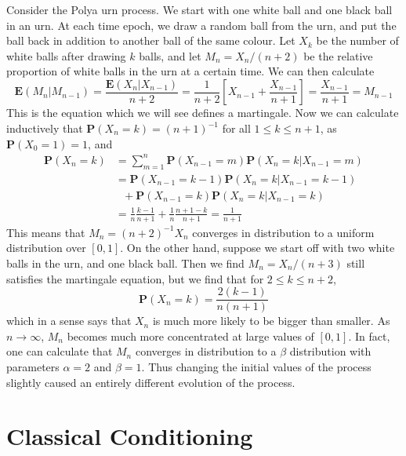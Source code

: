 \begin{example}
    Consider the Polya urn process. We start with one white ball and one black ball in an urn. At each time epoch, we draw a random ball from the urn, and put the ball back in addition to another ball of the same colour. Let $X_k$ be the number of white balls after drawing $k$ balls, and let $M_n = X_n / (n+2)$ be the relative proportion of white balls in the urn at a certain time. We can then calculate
    \[ \mathbf{E}(M_n | M_{n-1}) = \frac{\mathbf{E}(X_n | X_{n-1})}{n+2} = \frac{1}{n+2} \left[ X_{n-1} + \frac{X_{n-1}}{n+1} \right] = \frac{X_{n-1}}{n+1} = M_{n-1} \]
    This is the equation which we will see defines a martingale. Now we can calculate inductively that $\mathbf{P}(X_n = k) = (n + 1)^{-1}$ for all $1 \leq k \leq n + 1$, as $\mathbf{P}(X_0 = 1) = 1$, and
    \begin{align*}
        \mathbf{P}(X_n = k) &= \sum_{m = 1}^n \mathbf{P}(X_{n-1} = m) \mathbf{P}(X_n = k | X_{n-1} = m) \\
        &= \mathbf{P}(X_{n-1} = k-1) \mathbf{P}(X_n = k | X_{n-1} = k-1)\\
        &\ \ \ + \mathbf{P}(X_{n-1} = k) \mathbf{P}(X_n = k | X_{n-1} = k)\\
        &= \frac{1}{n} \frac{k-1}{n+1} + \frac{1}{n} \frac{n + 1 - k}{n+1} = \frac{1}{n+1}
    \end{align*}
    This means that $M_n = (n+2)^{-1}X_n$ converges in distribution to a uniform distribution over $[0,1]$. On the other hand, suppose we start off with two white balls in the urn, and one black ball. Then we find $M_n = X_n/(n+3)$ still satisfies the martingale equation, but we find that for $2 \leq k \leq n + 2$,
    \[ \mathbf{P}(X_n = k) = \frac{2(k-1)}{n(n+1)} \]
    which in a sense says that $X_n$ is much more likely to be bigger than smaller. As $n \to \infty$, $M_n$ becomes much more concentrated at large values of $[0,1]$. In fact, one can calculate that $M_n$ converges in distribution to a $\beta$ distribution with parameters $\alpha = 2$ and $\beta = 1$. Thus changing the initial values of the process slightly caused an entirely different evolution of the process.
\end{example}

\section{Classical Conditioning}

